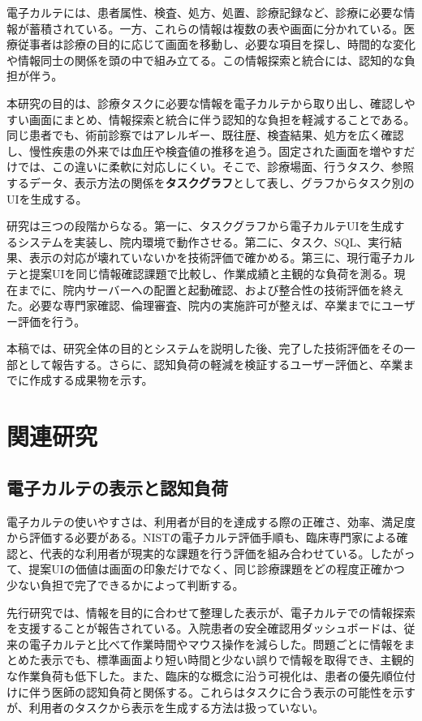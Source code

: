 \documentclass[a4paper]{jsarticle}
\newcommand{\term}[1]{\textbf{#1}}
\begin{document}
電子カルテには、患者属性、検査、処方、処置、診療記録など、診療に必要な情報が蓄積されている。一方、これらの情報は複数の表や画面に分かれている。医療従事者は診療の目的に応じて画面を移動し、必要な項目を探し、時間的な変化や情報同士の関係を頭の中で組み立てる。この情報探索と統合には、認知的な負担が伴う。

本研究の目的は、診療タスクに必要な情報を電子カルテから取り出し、確認しやすい画面にまとめ、情報探索と統合に伴う認知的な負担を軽減することである。同じ患者でも、術前診察ではアレルギー、既往歴、検査結果、処方を広く確認し、慢性疾患の外来では血圧や検査値の推移を追う。固定された画面を増やすだけでは、この違いに柔軟に対応しにくい。そこで、診療場面、行うタスク、参照するデータ、表示方法の関係を\term{タスクグラフ}として表し、グラフからタスク別のUIを生成する。

研究は三つの段階からなる。第一に、タスクグラフから電子カルテUIを生成するシステムを実装し、院内環境で動作させる。第二に、タスク、SQL、実行結果、表示の対応が壊れていないかを技術評価で確かめる。第三に、現行電子カルテと提案UIを同じ情報確認課題で比較し、作業成績と主観的な負荷を測る。現在までに、院内サーバーへの配置と起動確認、および整合性の技術評価を終えた。必要な専門家確認、倫理審査、院内の実施許可が整えば、卒業までにユーザー評価を行う。

本稿では、研究全体の目的とシステムを説明した後、完了した技術評価をその一部として報告する。さらに、認知負荷の軽減を検証するユーザー評価と、卒業までに作成する成果物を示す。

\section{関連研究}

\subsection{電子カルテの表示と認知負荷}

電子カルテの使いやすさは、利用者が目的を達成する際の正確さ、効率、満足度から評価する必要がある。NISTの電子カルテ評価手順も、臨床専門家による確認と、代表的な利用者が現実的な課題を行う評価を組み合わせている\cite{lowry2012ehr}。したがって、提案UIの価値は画面の印象だけでなく、同じ診療課題をどの程度正確かつ少ない負担で完了できるかによって判断する。

先行研究では、情報を目的に合わせて整理した表示が、電子カルテでの情報探索を支援することが報告されている。入院患者の安全確認用ダッシュボードは、従来の電子カルテと比べて作業時間やマウス操作を減らした\cite{fuller2020dashboard}。問題ごとに情報をまとめた表示でも、標準画面より短い時間と少ない誤りで情報を取得でき、主観的な作業負荷も低下した\cite{semanik2021problem}。また、臨床的な概念に沿う可視化は、患者の優先順位付けに伴う医師の認知負荷と関係する\cite{pollack2020visualization}。これらはタスクに合う表示の可能性を示すが、利用者のタスクから表示を生成する方法は扱っていない。
\end{document}
